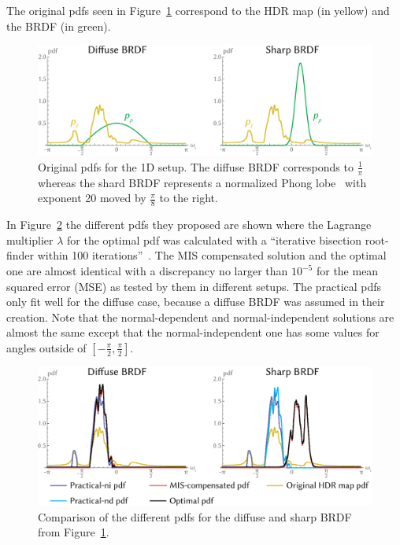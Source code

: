 The original pdfs seen in Figure~\ref{fig:ibl_pdfs} correspond to the HDR map (in yellow) and the BRDF (in green).

\begin{figure}
    \centering
    \includegraphics[width=.7\textwidth]{images/ibl_pdfs.png}
    \caption{Original pdfs for the 1D setup.
    The diffuse BRDF corresponds to $ \frac{1}{\pi} $
    whereas the shard BRDF represents a normalized Phong lobe~\cite{phong} with exponent 20 moved by $ \frac{\pi}{8} $ to the right.
    \cite[Figure~4]{Karlik2019}}
    \label{fig:ibl_pdfs}
\end{figure}

In Figure~\ref{fig:compensated_pdfs} the different pdfs they proposed are shown
where the Lagrange multiplier $ \lambda $ for the optimal pdf was calculated with a \enquote{iterative bisection root-finder within 100 iterations}~\cite[Section~6.3]{Karlik2019}.
The MIS compensated solution and the optimal one are almost identical with a discrepancy no larger than $ 10^{-5} $
for the mean squared error (MSE) as tested by them in different setups.
The practical pdfs only fit well for the diffuse case, because a diffuse BRDF was assumed in their creation.
Note that the normal-dependent and normal-independent solutions are almost the same except that the normal-independent one has some values for angles outside of $ [ -\frac{\pi}{2}, \frac{\pi}{2} ] $.

\begin{figure}
    \centering
    \includegraphics[width=.7\textwidth]{images/ibl_compensated_pdfs.png}
    \caption{Comparison of the different pdfs for the diffuse and sharp BRDF from Figure~\ref{fig:ibl_pdfs}.
    \cite[Figure~5]{Karlik2019}}
    \label{fig:compensated_pdfs}
\end{figure}

